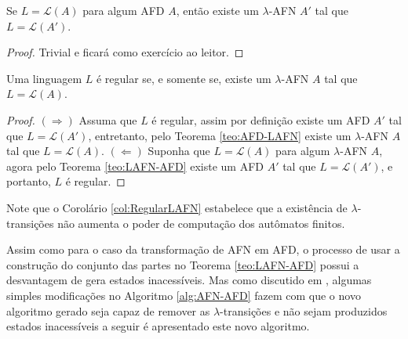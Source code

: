 \begin{theorem}\label{teo:AFD-LAFN}
	Se $L = \mathcal{L}(A)$ para algum AFD $A$, então existe um $\lambda$-AFN $A'$ tal que $L = \mathcal{L}(A')$.
\end{theorem}

\begin{proof}
	Trivial e ficará como exercício ao leitor.
\end{proof}

\begin{corollary}\label{col:RegularLAFN}
	Uma linguagem $L$ é regular se, e somente se, existe um $\lambda$-AFN $A$ tal que $L = \mathcal{L}(A)$.
\end{corollary}

\begin{proof}
	$(\Rightarrow)$ Assuma que $L$ é regular, assim por definição existe um AFD $A'$ tal que $L = \mathcal{L}(A')$, entretanto, pelo Teorema \ref{teo:AFD-LAFN} existe um $\lambda$-AFN $A$ tal que $L = \mathcal{L}(A)$. $(\Leftarrow)$ Suponha que $L = \mathcal{L}(A)$ para algum $\lambda$-AFN $A$, agora pelo Teorema \ref{teo:LAFN-AFD} existe um AFD $A'$ tal que $L = \mathcal{L}(A')$, e portanto, $L$ é regular.
\end{proof}

\begin{remark}
	Note que o Corolário \ref{col:RegularLAFN} estabelece que a existência de $\lambda$-transições não aumenta o poder de computação dos autômatos finitos.
\end{remark}

Assim como para o caso da transformação de AFN em AFD, o processo de usar a construção do conjunto das partes no Teorema \ref{teo:LAFN-AFD} possui a desvantagem de gera estados inacessíveis. Mas como discutido em \cite{benja-2011, benja-2015, hopcroft2008, linz2006}, algumas simples modificações no Algoritmo \ref{alg:AFN-AFD} fazem com que o novo algoritmo gerado seja capaz de remover as $\lambda$-transições e não sejam produzidos estados inacessíveis a seguir é apresentado este novo algoritmo.

